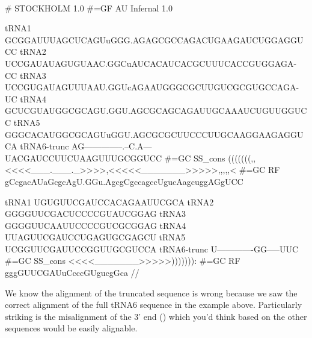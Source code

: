 \\

{\samepage
\begin{sreoutput}
# STOCKHOLM 1.0
#=GF AU Infernal 1.0

tRNA1        GCGGAUUUAGCUCAGUuGGG.AGAGCGCCAGACUGAAGAUCUGGAGGUCC
tRNA2        UCCGAUAUAGUGUAAC.GGCuAUCACAUCACGCUUUCACCGUGGAGA-CC
tRNA3        UCCGUGAUAGUUUAAU.GGUcAGAAUGGGCGCUUGUCGCGUGCCAGA-UC
tRNA4        GCUCGUAUGGCGCAGU.GGU.AGCGCAGCAGAUUGCAAAUCUGUUGGUCC
tRNA5        GGGCACAUGGCGCAGUuGGU.AGCGCGCUUCCCUUGCAAGGAAGAGGUCA
tRNA6-trunc  AG--------------.--C.A---UACGAUCCUUCUAAGUUUGCGGUCC
#=GC SS_cons (((((((,,<<<<___.___._>>>>,<<<<<_______>>>>>,,,,,<
#=GC RF      gCcgacAUaGcgcAgU.GGu.AgcgCgccagccUgucAagcuggAGgUCC

tRNA1        UGUGUUCGAUCCACAGAAUUCGCA
tRNA2        GGGGUUCGACUCCCCGUAUCGGAG
tRNA3        GGGGUUCAAUUCCCCGUCGCGGAG
tRNA4        UUAGUUCGAUCCUGAGUGCGAGCU
tRNA5        UCGGUUCGAUUCCGGUUGCGUCCA
tRNA6-trunc  U-------------GG-----UUC
#=GC SS_cons <<<<_______>>>>>))))))):
#=GC RF      gggGUUCGAUuCcccGUgucgGca
//
\end{sreoutput}
}

We know the alignment of the truncated sequence
 is wrong because we saw the correct alignment
of the full tRNA6 sequence in the example above. Particularly striking
is the misalignment of the 3' end () which you'd think
based on the other sequences would be easily alignable.

